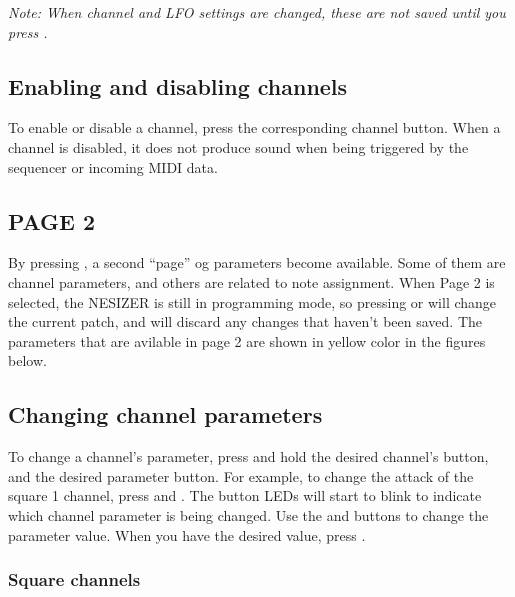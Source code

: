 \documentclass[a4paper, 12p]{extarticle}
\newcommand \name {NESIZER }
\newcommand {\btn}[1] {\framebox{\textbf{\footnotesize #1}}}
\begin{document}
\emph{Note: When channel and LFO settings are changed, these are not saved until you press \btn{SAVE}.}

\subsection{Enabling and disabling channels}
To enable or disable a channel, press the corresponding channel button. When a channel is disabled, it does not produce sound when being triggered by the sequencer or incoming MIDI data.

\subsection{PAGE 2}

By pressing \btn{PAGE 2}, a second ``page'' og parameters become available. Some of them are channel parameters, and others are related to note assignment. When Page 2 is selected, the \name is still in programming mode, so pressing \btn{UP} or \btn{DOWN} will change the current patch, and will discard any changes that haven't been saved. The parameters that are avilable in page 2 are shown in yellow color in the figures below.

\subsection{Changing channel parameters}
To change a channel's parameter, press and hold the desired channel's button, and the desired parameter button. For example, to change the attack of the square 1 channel, press \btn{SQ1} and \btn{A}. The button LEDs will start to blink to indicate which channel parameter is being changed. Use the \btn{UP} and \btn{DOWN} buttons to change the parameter value. When you have the desired value, press \btn{SAVE}.

\subsubsection{Square channels}

\end{document}
